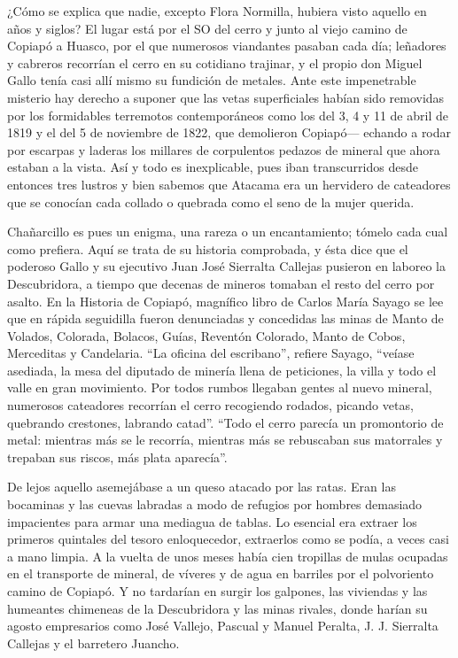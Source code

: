 \documentclass[10pt,twoside,openright]{memoir}
\begin{document}
¿Cómo se explica que nadie, excepto Flora Normilla, hubiera visto
aquello en años y siglos? El lugar está por el SO del cerro y junto al
viejo camino de Copiapó a Huasco, por el que numerosos viandantes
pasaban cada día; leñadores y cabreros recorrían el cerro en su
cotidiano trajinar, y el propio don Miguel Gallo tenía casi allí mismo
su fundición de metales. Ante este impenetrable misterio hay derecho a
suponer que las vetas superficiales habían sido removidas por los
formidables terremotos contemporáneos como los del 3, 4 y 11 de abril de
1819 y el del 5 de noviembre de 1822, que demolieron Copiapó--- echando
a rodar por escarpas y laderas los millares de corpulentos pedazos de
mineral que ahora estaban a la vista. Así y todo es inexplicable, pues
iban transcurridos desde entonces tres lustros y bien sabemos que
Atacama era un hervidero de cateadores que se conocían cada collado o
quebrada como el seno de la mujer querida.

Chañarcillo es pues un enigma, una rareza o un encantamiento; tómelo
cada cual como prefiera. Aquí se trata de su historia comprobada, y ésta
dice que el poderoso Gallo y su ejecutivo Juan José Sierralta Callejas
pusieron en laboreo la Descubridora, a tiempo que decenas de mineros
tomaban el resto del cerro por asalto. En la Historia de Copiapó,
magnífico libro de Carlos María Sayago se lee que en rápida seguidilla
fueron denunciadas y concedidas las minas de Manto de Volados, Colorada,
Bolacos, Guías, Reventón Colorado, Manto de Cobos, Merceditas y
Candelaria. ``La oficina del escribano'', refiere Sayago, ``veíase
asediada, la mesa del diputado de minería llena de peticiones, la villa
y todo el valle en gran movimiento. Por todos rumbos llegaban gentes al
nuevo mineral, numerosos cateadores recorrían el cerro recogiendo
rodados, picando vetas, quebrando crestones, labrando catad''. ``Todo el
cerro parecía un promontorio de metal: mientras más se le recorría,
mientras más se rebuscaban sus matorrales y trepaban sus riscos, más
plata aparecía''.

De lejos aquello asemejábase a un queso atacado por las ratas. Eran las
bocaminas y las cuevas labradas a modo de refugios por hombres demasiado
impacientes para armar una mediagua de tablas. Lo esencial era extraer
los primeros quintales del tesoro enloquecedor, extraerlos como se
podía, a veces casi a mano limpia. A la vuelta de unos meses había cien
tropillas de mulas ocupadas en el transporte de mineral, de víveres y de
agua en barriles por el polvoriento camino de Copiapó. Y no tardarían en
surgir los galpones, las viviendas y las humeantes chimeneas de la
Descubridora y las minas rivales, donde harían su agosto empresarios
como José Vallejo, Pascual y Manuel Peralta, J. J. Sierralta Callejas y
el barretero Juancho.
\end{document}
